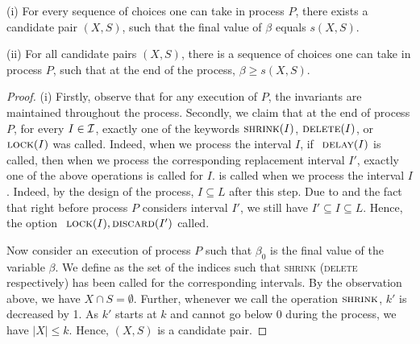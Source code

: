 \begin{lemma}
\label{lem:process_P}
(i) For every sequence of choices one can take in process $P$, there exists a candidate pair $(X,S)$, such that the final value of $\beta$ equals $s(X, S)$.

(ii) For all candidate pairs $(X,S)$, there is a sequence of choices one can take in process $P$, such that at the end of the process, $\beta \geq s(X, S)$. 
\end{lemma} 
\begin{proof}
(i) Firstly, observe that for any execution of $P$, the invariants \las{(\ref{eq:invariant_lock_in_alg})} are maintained throughout the process. 
Secondly, we claim that at the end of process $P$, for every $I \in \mathcal{I}$, exactly one of the keywords $\textsc{shrink}(I)$, $\textsc{delete}(I)$, or $\textsc{lock}(I)$ was called. 
Indeed, when we process the interval $I$, if  $\textsc{ delay}(I)$ is called, then when we process the corresponding replacement interval $I'$, exactly one of the above operations is called for $I$.
 is called when we process the interval $I$. 
Indeed, by the design of the process, $I \subseteq L$ after this step.
Due to  and the fact that  right before process $P$ considers interval $I'$, we still have $I' \subseteq I \subseteq L$. 
Hence, the option  $\textsc{ lock}(I), \textsc{discard}(I')$  called.

Now consider an execution of process $P$ such that $\beta_0$ is the final value of the variable $\beta$.
We define  as the set of the indices such that \textsc{shrink} (\textsc{delete} respectively) has been called for the corresponding intervals. 
By the observation above, we have $X \cap S = \emptyset$.
Further, whenever we call the operation $\textsc{shrink}$, $k'$ is decreased by 1.
As $k'$ starts at $k$ and cannot go below 0 during the process, we have $|X| \leq k$.
Hence, $(X, S)$ is a candidate pair.


\end{proof}

